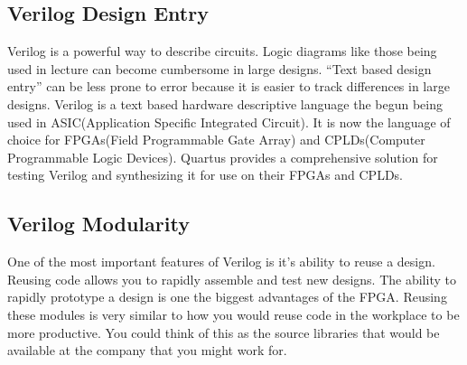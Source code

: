     \subsection{Verilog Design Entry}
      Verilog is a powerful way to describe circuits. Logic diagrams like those being used in lecture can become cumbersome in large designs. ``Text based design entry'' can be less prone to error because it is easier to track differences in large designs. Verilog is a text based hardware descriptive language the begun being used in ASIC(Application Specific Integrated Circuit). It is now the language of choice for FPGAs(Field Programmable Gate Array) and CPLDs(Computer Programmable Logic Devices). Quartus provides a comprehensive solution for testing Verilog and synthesizing it for use on their FPGAs and CPLDs.

    \subsection{Verilog Modularity}
      One of the most important features of Verilog is it's ability to reuse a design. Reusing code allows you to  rapidly assemble and test new designs. The ability to rapidly prototype a design is one the biggest advantages of the FPGA. Reusing these modules is very similar to how you would reuse code in the workplace to be more productive. You could think of this as the source libraries that would be available at the company that you might work for.

